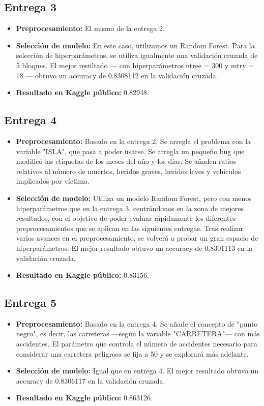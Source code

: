 \subsection{Entrega 3}
\begin{itemize}
\item \textbf{Preprocesamiento:} El mismo de la entrega 2.
\item \textbf{Selección de modelo:} En este caso, utilizamos un Random Forest. Para la selección de hiperparámetros, se utiliza igualmente una validación cruzada de 5 bloques. El mejor resultado --- con hiperparámetros ntree = 300 y mtry = 18 --- obtuvo un accuracy de 0.8308112 en la validación cruzada.
\item \textbf{Resultado en Kaggle público:} 0.82948.
\end{itemize}

\subsection{Entrega 4}
\begin{itemize}
\item \textbf{Preprocesamiento:} Basado en la entrega 2. Se arregla el problema con la variable "ISLA", que pasa a poder usarse. Se arregla un pequeño bug que modificó las etiquetas de los meses del año y los días. Se añaden ratios relativos al número de muertos, heridos graves, heridos leves y vehículos implicados por víctima.
\item \textbf{Selección de modelo:} Utiliza un modelo Random Forest, pero con menos hiperparámetros que en la entrega 3, centrándonos en la zona de mejores resultados, con el objetivo de poder evaluar rápidamente los diferentes preprocesamientos que se aplican en las siguientes entregas. Tras realizar varios avances en el preprocesamiento, se volverá a probar un gran espacio de hiperparámetros. El mejor resultado obtuvo un accuracy de 0.8301113 en la validación cruzada.
\item \textbf{Resultado en Kaggle público:} 0.83156.
\end{itemize}

\subsection{Entrega 5}
\begin{itemize}
\item \textbf{Preprocesamiento:} Basado en la entrega 4. Se añade el concepto de "punto negro", es decir, las carreteras ---según la variable "CARRETERA"--- con más accidentes. El parámetro que controla el número de accidentes necesario para considerar una carretera peligrosa se fija a 50 y se explorará más adelante.
\item \textbf{Selección de modelo:} Igual que en entrega 4. El mejor resultado obtuvo un accuracy de 0.8306117 en la validación cruzada.
\item \textbf{Resultado en Kaggle público:} 0.863126.
\end{itemize}

